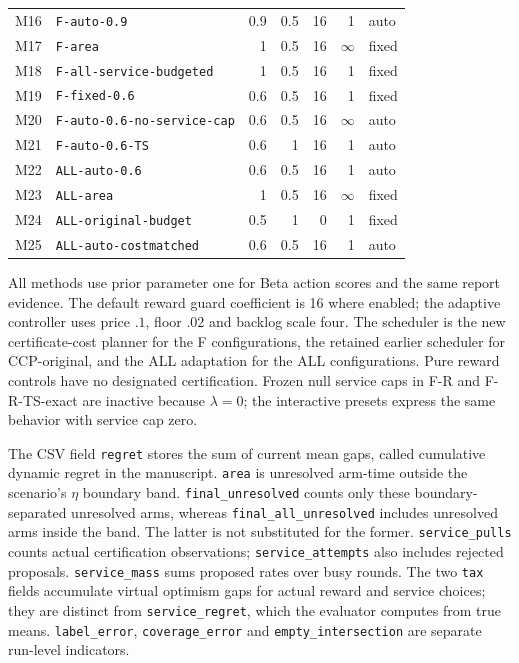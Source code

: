 \documentclass[11pt]{article}
\theoremstyle{remark}
\begin{document}
\begin{longtable}{llrrrrl}
M16 & \texttt{F-auto-0.9} & 0.9 & 0.5 & 16 & 1 & auto \\
M17 & \texttt{F-area} & 1 & 0.5 & 16 & $\infty$ & fixed \\
M18 & \texttt{F-all-service-budgeted} & 1 & 0.5 & 16 & 1 & fixed \\
M19 & \texttt{F-fixed-0.6} & 0.6 & 0.5 & 16 & 1 & fixed \\
M20 & \texttt{F-auto-0.6-no-service-cap} & 0.6 & 0.5 & 16 & $\infty$ & auto \\
M21 & \texttt{F-auto-0.6-TS} & 0.6 & 1 & 16 & 1 & auto \\
M22 & \texttt{ALL-auto-0.6} & 0.6 & 0.5 & 16 & 1 & auto \\
M23 & \texttt{ALL-area} & 1 & 0.5 & 16 & $\infty$ & fixed \\
M24 & \texttt{ALL-original-budget} & 0.5 & 1 & 0 & 1 & fixed \\
M25 & \texttt{ALL-auto-costmatched} & 0.6 & 0.5 & 16 & 1 & auto \\
\end{longtable}
\endgroup

All methods use prior parameter one for Beta action scores and the same report evidence. The default reward guard coefficient is 16 where enabled; the adaptive controller uses price $.1$, floor $.02$ and backlog scale four. The scheduler is the new certificate-cost planner for the F configurations, the retained earlier scheduler for CCP-original, and the ALL adaptation for the ALL configurations. Pure reward controls have no designated certification. Frozen null service caps in F-R and F-R-TS-exact are inactive because $\lambda=0$; the interactive presets express the same behavior with service cap zero.

The CSV field \texttt{regret} stores the sum of current mean gaps, called cumulative dynamic regret in the manuscript. \texttt{area} is unresolved arm-time outside the scenario's $\eta$ boundary band. \texttt{final\_unresolved} counts only these boundary-separated unresolved arms, whereas \texttt{final\_all\_unresolved} includes unresolved arms inside the band. The latter is not substituted for the former. \texttt{service\_pulls} counts actual certification observations; \texttt{service\_attempts} also includes rejected proposals. \texttt{service\_mass} sums proposed rates over busy rounds. The two \texttt{tax} fields accumulate virtual optimism gaps for actual reward and service choices; they are distinct from \texttt{service\_regret}, which the evaluator computes from true means. \texttt{label\_error}, \texttt{coverage\_error} and \texttt{empty\_intersection} are separate run-level indicators.
\end{document}
